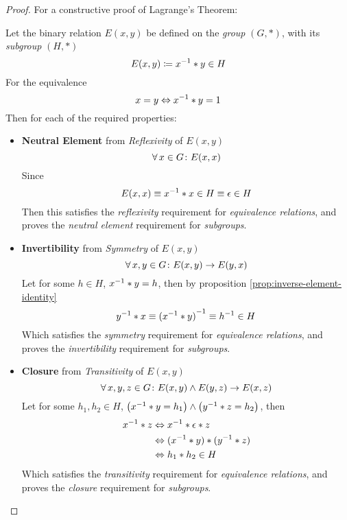 \begin{proof}
    For a constructive proof of Lagrange's Theorem: 
    
    Let the binary relation $E(x, y)$ be defined on the \textit{group} $(G, \ast)$, with its \textit{subgroup} $(H, \ast)$
    \begin{equation}
        E(x, y) \coloneqq {x}^{-1} \ast y \in H
    \end{equation}
    For the equivalence
    \begin{equation}
        x = y \Leftrightarrow {x}^{-1} \ast y = 1
    \end{equation}
    Then for each of the required properties:
    \begin{itemize}
        \item \textbf{Neutral Element} from \textit{Reflexivity} of $E(x, y)$
        \begin{equation}
            \operatorname{\forall} x \in G \colon E(x, x)
        \end{equation}
        Since
        \begin{equation}
            E(x, x) \equiv {x}^{-1} \ast x \in H \equiv \epsilon \in H
        \end{equation}
        Then this satisfies the \textit{reflexivity} requirement for  \textit{equivalence relations}, and proves the \textit{neutral element} requirement for \textit{subgroups}.
        \item \textbf{Invertibility} from \textit{Symmetry} of $E(x, y)$
        \begin{equation}
            \operatorname{\forall} x, y \in G \colon E(x, y) \to E(y, x)
        \end{equation}
        Let for some $h \in H$, ${x}^{-1} \ast y = h$, then by proposition \ref{prop:inverse-element-identity}
        \begin{equation}
            {y}^{-1} \ast x \equiv {({x}^{-1} \ast y)}^{-1} \equiv {h}^{-1} \in H
        \end{equation}
        Which satisfies the \textit{symmetry} requirement for \textit{equivalence relations}, and proves the \textit{invertibility} requirement for \textit{subgroups}.
        \item \textbf{Closure} from \textit{Transitivity} of $E(x, y)$
        \begin{equation}
            \operatorname{\forall} x, y, z \in G \colon E(x, y) \land E(y, z) \to E(x, z)
        \end{equation}
        Let for some $h_1, h_2 \in H$, $\left( {x}^{-1} \ast y = h_1 \right) \land \left( {y}^{-1} \ast z = h_2 \right)$, then
        \begin{align}
            {x}^{-1} \ast z &\Leftrightarrow {x}^{-1} \ast \epsilon \ast z \\
            &\Leftrightarrow ({x}^{-1} \ast y) \ast ({y}^{-1} \ast z) \\
            &\Leftrightarrow h_1 \ast h_2 \in H
        \end{align}
        Which satisfies the \textit{transitivity} requirement for \textit{equivalence relations}, and proves the \textit{closure} requirement for \textit{subgroups}.
    \end{itemize}
    

\end{proof}
